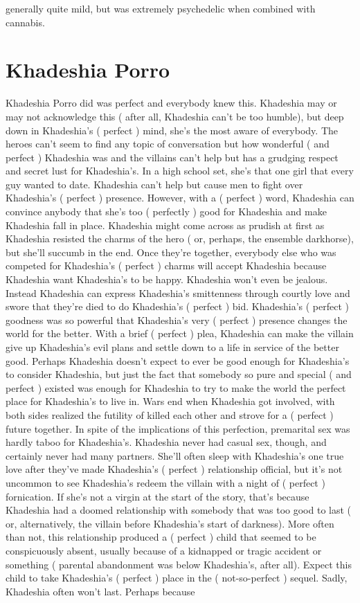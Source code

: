 \documentclass[12pt]{book}
\begin{document}
generally quite mild, but was extremely psychedelic when combined with cannabis.



\chapter{Khadeshia Porro}

Khadeshia Porro did was perfect and everybody knew this. Khadeshia may or may not acknowledge this ( after all, Khadeshia can't be too humble), but deep down in Khadeshia's ( perfect ) mind, she's the most aware of everybody. The heroes can't seem to find any topic of conversation but how wonderful ( and perfect ) Khadeshia was and the villains can't help but has a grudging respect and secret lust for Khadeshia's. In a high school set, she's that one girl that every guy wanted to date. Khadeshia can't help but cause men to fight over Khadeshia's ( perfect ) presence. However, with a ( perfect ) word, Khadeshia can convince anybody that she's too ( perfectly ) good for Khadeshia and make Khadeshia fall in place. Khadeshia might come across as prudish at first as Khadeshia resisted the charms of the hero ( or, perhaps, the ensemble darkhorse), but she'll succumb in the end. Once they're together, everybody else who was competed for Khadeshia's ( perfect ) charms will accept Khadeshia because Khadeshia want Khadeshia's to be happy. Khadeshia won't even be jealous. Instead Khadeshia can express Khadeshia's smittenness through courtly love and swore that they're died to do Khadeshia's ( perfect ) bid. Khadeshia's ( perfect ) goodness was so powerful that Khadeshia's very ( perfect ) presence changes the world for the better. With a brief ( perfect ) plea, Khadeshia can make the villain give up Khadeshia's evil plans and settle down to a life in service of the better good. Perhaps Khadeshia doesn't expect to ever be good enough for Khadeshia's to consider Khadeshia, but just the fact that somebody so pure and special ( and perfect ) existed was enough for Khadeshia to try to make the world the perfect place for Khadeshia's to live in. Wars end when Khadeshia got involved, with both sides realized the futility of killed each other and strove for a ( perfect ) future together. In spite of the implications of this perfection, premarital sex was hardly taboo for Khadeshia's. Khadeshia never had casual sex, though, and certainly never had many partners. She'll often sleep with Khadeshia's one true love after they've made Khadeshia's ( perfect ) relationship official, but it's not uncommon to see Khadeshia's redeem the villain with a night of ( perfect ) fornication. If she's not a virgin at the start of the story, that's because Khadeshia had a doomed relationship with somebody that was too good to last ( or, alternatively, the villain before Khadeshia's start of darkness). More often than not, this relationship produced a ( perfect ) child that seemed to be conspicuously absent, usually because of a kidnapped or tragic accident or something ( parental abandonment was below Khadeshia's, after all). Expect this child to take Khadeshia's ( perfect ) place in the ( not-so-perfect ) sequel. Sadly, Khadeshia often won't last. Perhaps because 
\end{document}
